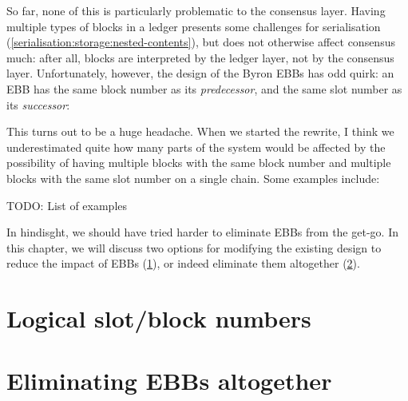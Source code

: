 So far, none of this is particularly problematic to the consensus layer. Having
multiple types of blocks in a ledger presents some challenges for serialisation
(\cref{serialisation:storage:nested-contents}), but does not otherwise affect
consensus much: after all, blocks are interpreted by the ledger layer, not by
the consensus layer. Unfortunately, however, the design of the Byron EBBs has
odd quirk: an EBB has the same block number as its \emph{predecessor}, and the
same slot number as its \emph{successor}:
%
\begin{center}
\end{center}
%
This turns out to be a huge headache. When we started the rewrite, I think we
underestimated quite how many parts of the system would be affected by the
possibility of having multiple blocks with the same block number and
multiple blocks with the same slot number on a single chain. Some examples
include:

TODO: List of examples

In hindisght, we should have tried harder to eliminate EBBs from the get-go. In
this chapter, we will discuss two options for modifying the existing design to
reduce the impact of EBBs (\cref{ebbs:logical}), or indeed eliminate them
altogether (\cref{ebbs:elimination}).

\section{Logical slot/block numbers}
\label{ebbs:logical}

\section{Eliminating EBBs altogether}
\label{ebbs:elimination}









